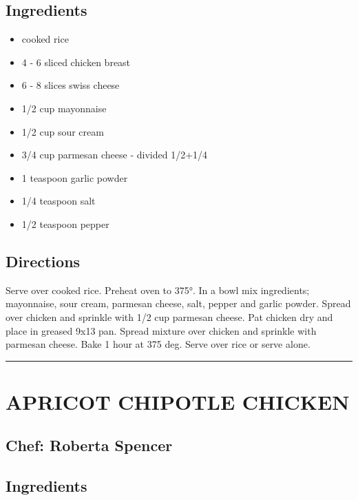\documentclass[
]{book}
\providecommand{\tightlist}{%
  \setlength{\itemsep}{0pt}\setlength{\parskip}{0pt}}
\begin{document}
\hypertarget{ingredients-39}{%
\subsection*{Ingredients}\label{ingredients-39}}


\begin{itemize}
\tightlist
\item
  cooked rice
\item
  4 - 6 sliced chicken breast
\item
  6 - 8 slices swiss cheese
\item
  1/2 cup mayonnaise
\item
  1/2 cup sour cream
\item
  3/4 cup parmesan cheese - divided 1/2+1/4
\item
  1 teaspoon garlic powder
\item
  1/4 teaspoon salt
\item
  1/2 teaspoon pepper
\end{itemize}

\hypertarget{directions-39}{%
\subsection*{Directions}\label{directions-39}}


Serve over cooked rice. Preheat oven to 375°. In a bowl mix ingredients; mayonnaise, sour cream, parmesan cheese, salt, pepper and garlic powder. Spread over chicken and sprinkle with 1/2 cup parmesan cheese. Pat chicken dry and place in greased 9x13 pan. Spread mixture over chicken and sprinkle with parmesan cheese. Bake 1 hour at 375 deg. Serve over rice or serve alone.

\begin{center}\rule{0.5\linewidth}{0.5pt}\end{center}

\hypertarget{apricot-chipotle-chicken}{%
\section*{APRICOT CHIPOTLE CHICKEN}\label{apricot-chipotle-chicken}}


\hypertarget{chef-roberta-spencer-13}{%
\subsection*{Chef: Roberta Spencer}\label{chef-roberta-spencer-13}}


\hypertarget{ingredients-40}{%
\subsection*{Ingredients}\label{ingredients-40}}
\end{document}
